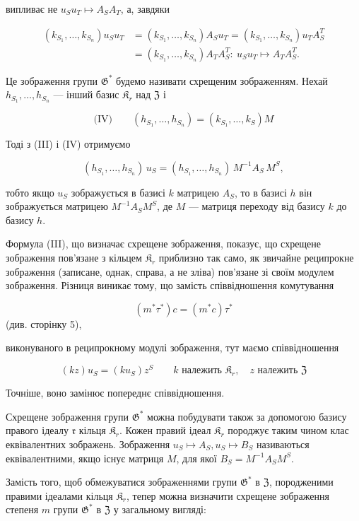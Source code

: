 \documentclass[11pt]{article}
\begin{document}
випливає не \(u_Su_T \mapsto A_SA_T\), а, завдяки

\[
\begin{aligned}
(k_{S_1}, \ldots, k_{S_n})u_Su_T
&=(k_{S_1}, \ldots, k_{S_n})A_Su_T
=(k_{S_1}, \ldots, k_{S_n})u_TA_S^T\\
&=(k_{S_1}, \ldots, k_{S_n})A_TA_S^T:\ u_Su_T\mapsto A_TA_S^T.
\end{aligned}
\]

Це зображення групи \(\mathfrak{G}^*\) будемо називати схрещеним зображенням. Нехай \(h_{S_1}, \ldots, h_{S_n}\) --- інший базис \(\mathfrak{K}_r\) над \(\mathfrak{Z}\) і

\[
\text{(IV)}\qquad (h_{S_1}, \ldots, h_{S_n}) = (k_{S_1}, \ldots, k_S)M
\]

Тоді з (III) і (IV) отримуємо

\[(h_{S_1},\ldots,h_{S_n})\,u_S=(h_{S_1},\ldots,h_{S_n})\,M^{-1}A_S\,M^S,\]

тобто якщо \(u_S\) зображується в базисі \(k\) матрицею \(A_S\), то в базисі \(h\) він зображується матрицею \(M^{-1}A_SM^S\), де \(M\) --- матриця переходу від базису \(k\) до базису \(h\).

Формула (III), що визначає схрещене зображення, показує, що схрещене зображення пов'язане з кільцем \(\mathfrak K_r\) приблизно так само, як звичайне реципрокне зображення (записане, однак, справа, а не зліва) пов'язане зі своїм модулем зображення. Різниця виникає тому, що замість співвідношення комутування

\[(m^*\tau^*)c = (m^*c)\tau^*\]
(див. сторінку 5),

виконуваного в реципрокному модулі зображення, тут маємо співвідношення

\[
(kz)u_S=(ku_S)z^S\qquad k\text{ належить }\mathfrak K_r,\quad z\text{ належить }\mathfrak Z
\]

Точніше, воно замінює попереднє співвідношення.

Схрещене зображення групи \(\mathfrak{G}^*\) можна побудувати також за допомогою базису правого ідеалу \(\mathfrak r\) кільця \(\mathfrak{K}_r\). Кожен правий ідеал \(\mathfrak{K}_r\) породжує таким чином клас еквівалентних зображень. Зображення \(u_S \mapsto A_S, u_S \mapsto B_S\) називаються еквівалентними, якщо існує матриця \(M\), для якої \(B_S = M^{-1}A_SM^S\).

Замість того, щоб обмежуватися зображеннями групи \(\mathfrak G^*\) в \(\mathfrak Z\), породженими правими ідеалами кільця \(\mathfrak K_r\), тепер можна визначити схрещене зображення степеня \(m\) групи \(\mathfrak G^*\) в \(\mathfrak Z\) у загальному вигляді:
\end{document}
